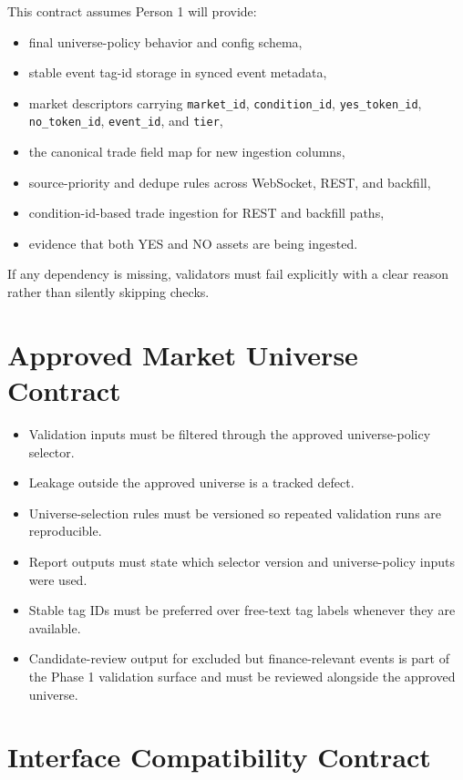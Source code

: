 \documentclass{article}
\begin{document}
This contract assumes Person 1 will provide:
\begin{itemize}
\item final universe-policy behavior and config schema,
\item stable event tag-id storage in synced event metadata,
\item market descriptors carrying \texttt{market\_id}, \texttt{condition\_id},
\texttt{yes\_token\_id}, \texttt{no\_token\_id}, \texttt{event\_id}, and
\texttt{tier},
\item the canonical trade field map for new ingestion columns,
\item source-priority and dedupe rules across WebSocket, REST, and backfill,
\item condition-id-based trade ingestion for REST and backfill paths,
\item evidence that both YES and NO assets are being ingested.
\end{itemize}

If any dependency is missing, validators must fail explicitly with a clear
reason rather than silently skipping checks.

\section*{Approved Market Universe Contract}

\begin{itemize}
\item Validation inputs must be filtered through the approved universe-policy
selector.
\item Leakage outside the approved universe is a tracked defect.
\item Universe-selection rules must be versioned so repeated validation runs are
reproducible.
\item Report outputs must state which selector version and universe-policy
inputs were used.
\item Stable tag IDs must be preferred over free-text tag labels whenever they
are available.
\item Candidate-review output for excluded but finance-relevant events is part
of the Phase 1 validation surface and must be reviewed alongside the approved
universe.
\end{itemize}

\section*{Interface Compatibility Contract}
\end{document}
